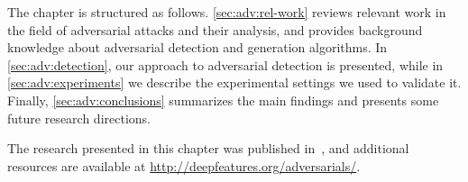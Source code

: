 %



The chapter is structured as follows.
\ref{sec:adv:rel-work} reviews relevant work in the field of adversarial attacks and their analysis, and provides background knowledge about adversarial detection and generation algorithms.
In \ref{sec:adv:detection}, our approach to adversarial detection is presented, while in \ref{sec:adv:experiments} we describe the experimental settings we used to validate it.
Finally, \ref{sec:adv:conclusions} summarizes the main findings and presents some future research directions.

The research presented in this chapter was published in~\cite{carrara2017detecting,carrara2018adversarial}, and additional resources are available at \url{http://deepfeatures.org/adversarials/}.


